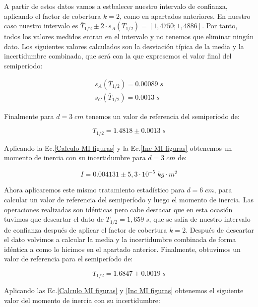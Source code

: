 \documentclass[a4paper,12pt,titlepage]{report}
\begin{document}
A partir de estos datos vamos a estbalecer nuestro intervalo de confianza, aplicando el factor de cobertura $k=2$, como en apartados anteriores. En nuestro caso nuestro intervalo es $\overline{T}_{1/2} \pm 2\cdot s_A(T_{1/2}) = [1,4750;1,4886]$. Por tanto, todos los valores medidos entran en el intervalo y no tenemos que eliminar ningún dato. Los siguientes valores calculados son la desviación típica de la media y la incertidumbre combinada, que será con la que expresemos el valor final del semiperíodo:

\begin{equation}
    \begin{gathered}
        s_A(\overline{T}_{1/2}) = 0.00089\; s\\
        s_C(\overline{T}_{1/2}) = 0.0013\; s
    \end{gathered}
\end{equation}

Finalmente para $d=3 \; cm$ tenemos un valor de referencia del semiperíodo de:

\begin{equation}
    T_{1/2} = 1.4818 \pm 0.0013\; s
\end{equation}

Aplicando la Ec.\ref{Calculo MI figuras} y la Ec.\ref{Inc MI figuras} obtenemos un momento de inercia con su incertidumbre para $d=3 \; cm$ de:

\begin{equation}
    I = 0.004131 \pm 5,3 \cdot 10^{-5} \; kg\cdot m^2
\end{equation}

Ahora aplicaremos este mismo tratamiento estadístico para $d=6 \; cm$, para calcular un valor de referencia del semiperíodo y luego el momento de inercia. Las operaciones realizadas son idénticas pero cabe destacar que en esta ocasión tuvimos que descartar el dato de $T_{1/2}=1,659 \;s$, que se salía de nuestro intervalo de confianza después de aplicar el factor de cobertura $k=2$. Después de descartar el dato volvimos a calcular la media y la incertidumbre combinada de forma idéntica a como lo hicimos en el apartado anterior. Finalmente, obtuvimos un valor de referencia para el semiperíodo de:

\begin{equation}
    T_{1/2} = 1.6847 \pm 0.0019 \; s
\end{equation}

Aplicando las Ec.\ref{Calculo MI figuras} y \ref{Inc MI figuras} obtenemos el siguiente valor del momento de inercia con su incertidumbre:
\end{document}
